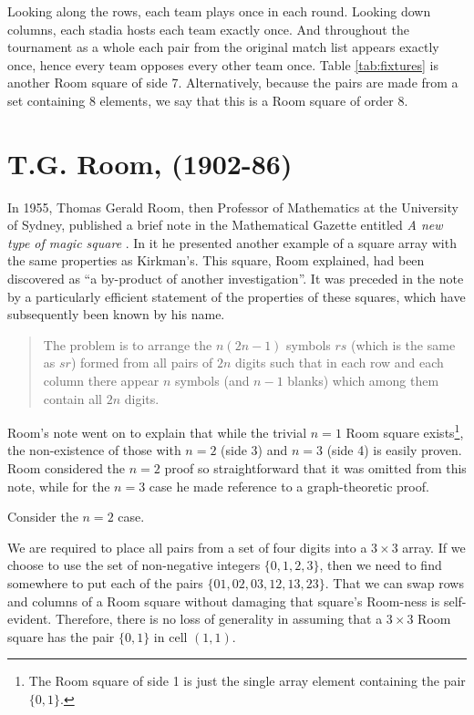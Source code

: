 \documentclass[11pt, a4paper]{book}\usepackage[]{graphicx}\usepackage[]{xcolor}
\newcounter{example}
\begin{document}
Looking along the rows, each team plays once in each round.
Looking down columns, each stadia hosts each team exactly once.
And throughout the tournament as a whole each pair from the original match list appears exactly once, hence every team opposes every other team once.
Table \ref{tab:fixtures} is another Room square of side 7.
Alternatively, because the pairs are made from a set containing 8 elements, we say that this is a Room square of order 8.

\section{T.G. Room, (1902-86)}

In 1955, Thomas Gerald Room, then Professor of Mathematics at the University of Sydney, published a brief note in the Mathematical Gazette entitled
\emph{A new type of magic square}
\cite{room2569NewType1955}.
In it he presented another example of a square array with the same properties as Kirkman’s.
This square, Room explained, had been discovered as ``a by-product of another investigation''.
It was preceded in the note by a particularly efficient statement of the properties of these squares, which have subsequently been known by his name.

\begin{quotation}
The problem is to arrange the $n(2n - 1)$ symbols $rs$ (which is the same as $sr$) formed from all pairs of $2n$ digits such that in each row and each column there appear $n$ symbols (and $n - 1$ blanks) which among them contain all $2n$ digits.
\end{quotation}

Room’s note went on to explain that while the trivial $n = 1$ Room square exists\footnote{The Room square of side 1 is just the single array element containing the pair $\{0, 1\}$.},
the non-existence of those with $n = 2$ (side 3) and $n = 3$ (side 4) is easily proven.
Room considered the $n = 2$ proof so straightforward that it was omitted from this note, while for the $n = 3$ case he made reference to a graph-theoretic proof.

Consider the $n = 2$ case.

We are required to place all pairs from a set of four digits into a $3 \times 3$ array.
If we choose to use the set of non-negative integers
$\{0, 1, 2, 3\}$,
then we need to find somewhere to put each of the pairs
$\{01, 02, 03, 12, 13, 23\}$.
That we can swap rows and columns of a Room square without damaging that square’s Room-ness is self-evident.
Therefore, there is no loss of generality in assuming that a $3 \times 3$ Room square has the pair $\{0, 1\}$ in cell $(1, 1)$.
\end{document}
